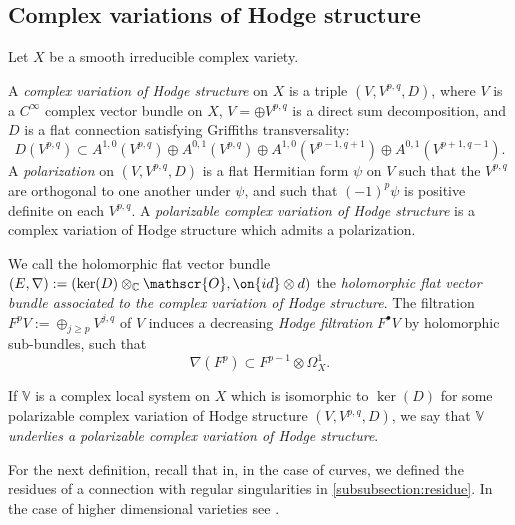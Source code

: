 \subsection{Complex variations of Hodge structure}
Let $X$ be a smooth irreducible complex variety.
\begin{definition}
\notready
	\label{definition:complex-variation}
	A {\em complex variation of Hodge structure} on $X$ is a triple $(V,
	V^{p,q}, D)$, where $V$ is a $C^\infty$ complex vector bundle on $X$,
	$V=\oplus V^{p,q}$ is a direct sum decomposition, and $D$ is a flat
	connection satisfying Griffiths transversality: $$D(V^{p,q})\subset
	A^{1,0}(V^{p,q})\oplus A^{0,1}(V^{p,q})\oplus A^{1,0}(V^{p-1,q+1})\oplus
	A^{0,1}(V^{p+1, q-1}).$$
	A {\em polarization} on $(V, V^{p,q}, D)$ is a flat Hermitian form $\psi$ on $V$ such that the $V^{p,q}$ are orthogonal to one another under $\psi$, and such that $(-1)^p\psi$ is positive definite on each $V^{p,q}$.
	A {\em polarizable complex variation of Hodge structure} is a complex
	variation of Hodge structure which admits a polarization.

    We call the holomorphic flat vector bundle $(E,
    \nabla):=(\ker(D)\otimes_{\mathbb{C}} \mathscr{O}, \on{id}\otimes d)$ the
    {\em holomorphic flat vector bundle associated to the complex variation of
    Hodge structure}. The filtration $F^pV:=\oplus_{j\geq p} V^{j,q}$ of $V$ induces a decreasing \emph{Hodge filtration} $F^\bullet V$ by holomorphic sub-bundles, such that \begin{equation}\label{eqn:griffiths-transversality} \nabla(F^p)\subset F^{p-1}\otimes \Omega^1_X.\end{equation}

    If $\mathbb{V}$ is a complex local system on $X$ which is isomorphic to
    $\ker(D)$ for some polarizable complex variation of Hodge structure $(V, V^{p,q}, D)$, we say that $\mathbb{V}$ \emph{underlies a polarizable complex variation of Hodge structure}.
\end{definition}

For the next definition, recall that in, in the case of curves, we defined the
residues of a connection with regular singularities in
\autoref{subsubsection:residue}.
In the case of higher dimensional varieties see
\cite[p. 53]{deligne:regular-singular}.


